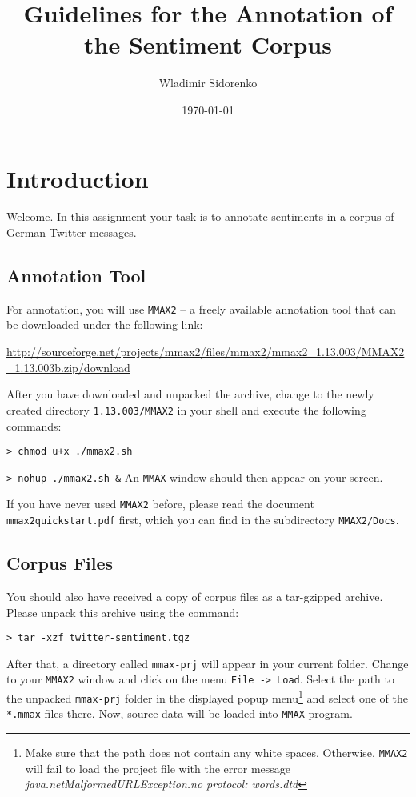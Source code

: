 \documentclass[11pt,a4paper]{article}
\author{Wladimir Sidorenko}
\date{\today}
\title{Guidelines for the Annotation of the Sentiment Corpus}
\begin{document}
\maketitle{}
\section{Introduction}
Welcome. In this assignment your task is to annotate sentiments in a
corpus of German Twitter messages.

\subsection{Annotation Tool}

For annotation, you will use \texttt{MMAX2} -- a freely available
annotation tool that can be downloaded under the following link:

\url{http://sourceforge.net/projects/mmax2/files/mmax2/mmax2_1.13.003/MMAX2_1.13.003b.zip/download}

After you have downloaded and unpacked the archive, change to the
newly created directory \texttt{1.13.003/MMAX2} in your shell and
execute the following commands:

\texttt{> chmod u+x ./mmax2.sh}

\texttt{> nohup ./mmax2.sh \&} \newline
{\setlength{\parindent}{0pt}An \texttt{MMAX} window should then appear
  on your screen.}

If you have never used \texttt{MMAX2} before, please read the document
\texttt{mmax2quickstart.pdf} first, which you can find in the
subdirectory \texttt{MMAX2/Docs}.

\subsection{Corpus Files}

You should also have received a copy of corpus files as a tar-gzipped
archive.  Please unpack this archive using the command:

\texttt{> tar -xzf twitter-sentiment.tgz}

{\setlength{\parindent}{0pt} After that, a directory called
  \texttt{mmax-prj} will appear in your current folder.  Change to
  your \texttt{MMAX2} window and click on the menu \texttt{File ->
    Load}.  Select the path to the unpacked \texttt{mmax-prj} folder
  in the displayed popup menu\footnote{Make sure that the path does
    not contain any white spaces.  Otherwise, \texttt{MMAX2} will fail
    to load the project file with the error message
    \emph{java.netMalformedURLException.no protocol: words.dtd}} and
  select one of the \texttt{*.mmax} files there.  Now, source data will
  be loaded into \texttt{MMAX} program.}
\end{document}
